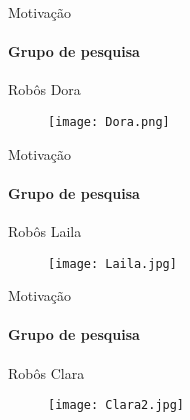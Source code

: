 \documentclass[25pt,landscape]{beamer}
\begin{document}
\begin{frame}{Motiva\c{c}\~ao}
	\framesubtitle{Grupo de pesquisa}
	\begin{block}{Rob\^os}
		Dora
    \end{block}
    \begin{figure}[!h]
        \centering
        \texttt{[image: Dora.png]}
    \end{figure}
\end{frame}

\begin{frame}{Motiva\c{c}\~ao}
	\framesubtitle{Grupo de pesquisa}
	\begin{block}{Rob\^os}
		Laila
    \end{block}
    \begin{figure}[!h]
        \centering
        \texttt{[image: Laila.jpg]}
    \end{figure}
\end{frame}

\begin{frame}{Motiva\c{c}\~ao}
	\framesubtitle{Grupo de pesquisa}
	\begin{block}{Rob\^os}
		Clara
    \end{block}
    \begin{figure}[!h]
        \centering
        \texttt{[image: Clara2.jpg]}
    \end{figure}
\end{frame}
\end{document}
